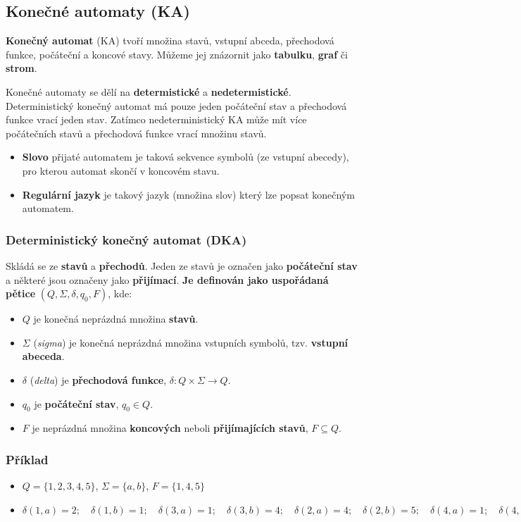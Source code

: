 \subsection{Konečné automaty (KA)}
\textbf{Konečný automat} (KA) tvoří množina stavů, vstupní abceda, přechodová funkce, počáteční a koncové stavy. Můžeme jej znázornit jako \textbf{tabulku}, \textbf{graf} či \textbf{strom}.

Konečné automaty se dělí na \textbf{determistické} a \textbf{nedetermistické}. Deterministický konečný automat má pouze jeden počáteční stav a přechodová funkce vrací jeden stav. Zatímco nedeterministický KA může mít více počátečních stavů a přechodová funkce vrací množinu stavů.

\begin{itemize}
\item \textbf{Slovo} přijaté automatem je taková sekvence symbolů (ze vstupní abecedy), pro kterou automat skončí v koncovém stavu.
\item \textbf{Regulární jazyk} je takový jazyk (množina slov) který lze popsat konečným automatem. 
\end{itemize}

\subsubsection{Deterministický konečný automat (DKA)}
Skládá se ze \textbf{stavů} a \textbf{přechodů}. Jeden ze stavů je označen jako \textbf{počáteční stav} a některé jsou označeny jako \textbf{přijímací}. \textbf{Je definován jako uspořádaná pětice} $(Q, \Sigma, \delta, q_0, F)$, kde: 
\begin{itemize}
	\item $Q$ je konečná neprázdná množina \textbf{stavů}. 
	\item $\Sigma$ (\textit{sigma}) je konečná neprázdná množina vstupních symbolů, tzv. \textbf{vstupní abeceda}. 
	\item $\delta$ (\textit{delta}) je \textbf{přechodová funkce}, $\delta: Q\times\Sigma \rightarrow Q$. 
	\item $q_0$ je \textbf{počáteční stav}, $q_0 \in Q$.
	\item $F$ je neprázdná množina \textbf{koncových} neboli \textbf{přijímajících stavů}, $F \subseteq Q$.
\end{itemize}

\subsubsection*{Příklad}
\begin{itemize}
	\item $Q = \{1, 2, 3, 4, 5\}$, $\Sigma = \{a, b\}$, $F =  \{1, 4, 5\}$
	\item $\delta(1, a) = 2 ;\quad \delta(1, b) = 1   ;\quad \delta(3, a) = 1  ;\quad \delta(3, b) = 4; \quad  \delta(2, a) = 4  ; \quad  \delta(2, b) = 5; \quad  \delta(4, a) = 1;  \quad \delta(4, b) = 3;  \quad \delta(5, a) = 4; \quad  \delta(5, b) = 5$
\end{itemize}

